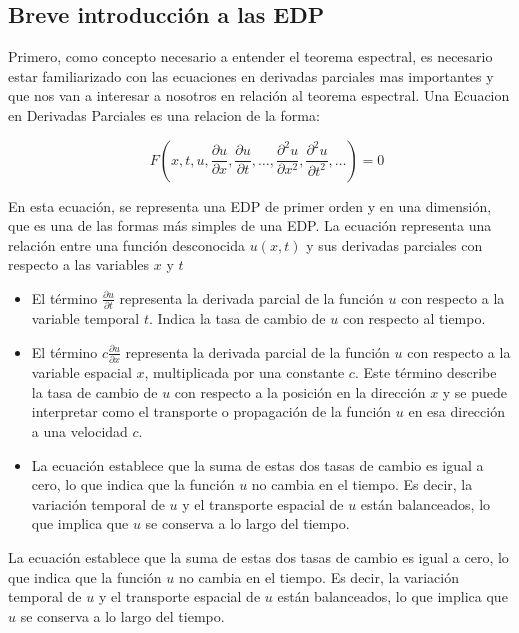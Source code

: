 \documentclass{article}
\begin{document}
    \subsection{Breve introducción a las EDP}
    Primero, como concepto necesario a entender el teorema espectral, es necesario estar familiarizado con las ecuaciones en derivadas parciales mas importantes y que nos van a interesar a nosotros en relación al teorema espectral.
    Una Ecuacion en Derivadas Parciales es una relacion de la forma:
    
    \begin{equation}
        \quad F\left(x, t, u, \frac{\partial u}{\partial x}, \frac{\partial u}{\partial t}, \ldots, \frac{\partial^2 u}{\partial x^2}, \frac{\partial^2 u}{\partial t^2}, \ldots\right) = 0
        \end{equation}
        
        En esta ecuación, se representa una EDP de primer orden y en una dimensión, que es una de las formas más simples de una EDP. La ecuación representa una relación entre una función desconocida $u(x,t)$ y sus derivadas parciales con respecto a las variables $x$ y $t$
            
        \begin{itemize}
            \item El término $\frac{\partial u}{\partial t}$ representa la derivada parcial de la función $u$ con respecto a la variable temporal $t$. Indica la tasa de cambio de $u$ con respecto al tiempo.
            
            \item El término $c\frac{\partial u}{\partial x}$ representa la derivada parcial de la función $u$ con respecto a la variable espacial $x$, multiplicada por una constante $c$. Este término describe la tasa de cambio de $u$ con respecto a la posición en la dirección $x$ y se puede interpretar como el transporte o propagación de la función $u$ en esa dirección a una velocidad $c$.
            
            \item La ecuación establece que la suma de estas dos tasas de cambio es igual a cero, lo que indica que la función $u$ no cambia en el tiempo. Es decir, la variación temporal de $u$ y el transporte espacial de $u$ están balanceados, lo que implica que $u$ se conserva a lo largo del tiempo.
        \end{itemize}
        La ecuación establece que la suma de estas dos tasas de cambio es igual a cero, lo que indica que la función $u$ no cambia en el tiempo. Es decir, la variación temporal de $u$ y el transporte espacial de $u$ están balanceados, lo que implica que $u$ se conserva a lo largo del tiempo.
 
\end{document}
